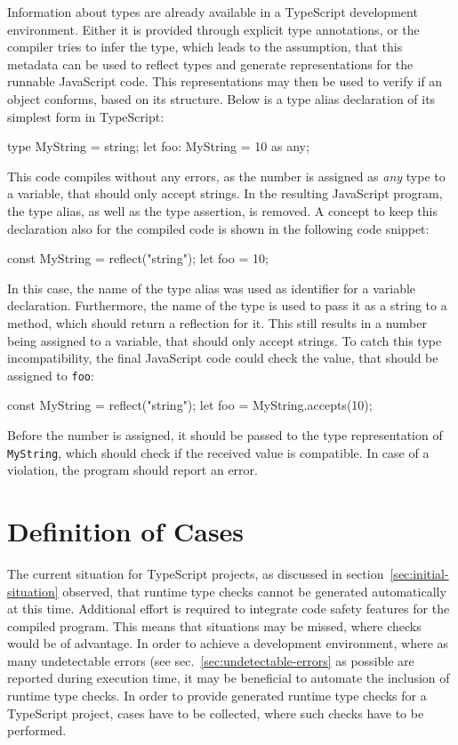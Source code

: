 Information about types are already available in a TypeScript development environment. Either it is provided through explicit type annotations, or the compiler tries to infer the type, which leads to the assumption, that this metadata can be used to reflect types and generate representations for the runnable JavaScript code. This representations may then be used to verify if an object conforms, based on its structure. Below is a type alias declaration of its simplest form in TypeScript:
\begin{JsCode}[numbers=none]
type MyString = string;
let foo: MyString = 10 as any;
\end{JsCode}
This code compiles without any errors, as the number is assigned as \emph{any} type to a variable, that should only accept strings. In the resulting JavaScript program, the type alias, as well as the type assertion, is removed. A concept to keep this declaration also for the compiled code is shown in the following code snippet:
\begin{JsCode}[numbers=none]
const MyString = reflect("string");
let foo = 10;
\end{JsCode}
In this case, the name of the type alias was used as identifier for a variable declaration. Furthermore, the name of the type is used to pass it as a string to a method, which should return a reflection for it. This still results in a number being assigned to a variable, that should only accept strings. To catch this type incompatibility, the final JavaScript code could check the value, that should be assigned to \texttt{foo}:
\begin{JsCode}[numbers=none]
const MyString = reflect("string");
let foo = MyString.accepts(10);
\end{JsCode}
Before the number is assigned, it should be passed to the type representation of \texttt{MyString}, which should check if the received value is compatible. In case of a violation, the program should report an error.

\section{Definition of Cases}
\label{sec:type-check-situations}

The current situation for TypeScript projects, as discussed in section~\ref{sec:initial-situation} observed, that runtime type checks cannot be generated automatically at this time. Additional effort is required to integrate code safety features for the compiled program. This means that situations may be missed, where checks would be of advantage. In order to achieve a development environment, where as many undetectable errors (see sec.~\ref{sec:undetectable-errors} as possible are reported during execution time, it may be beneficial to automate the inclusion of runtime type checks. In order to provide generated runtime type checks for a TypeScript project, cases have to be collected, where such checks have to be performed.

